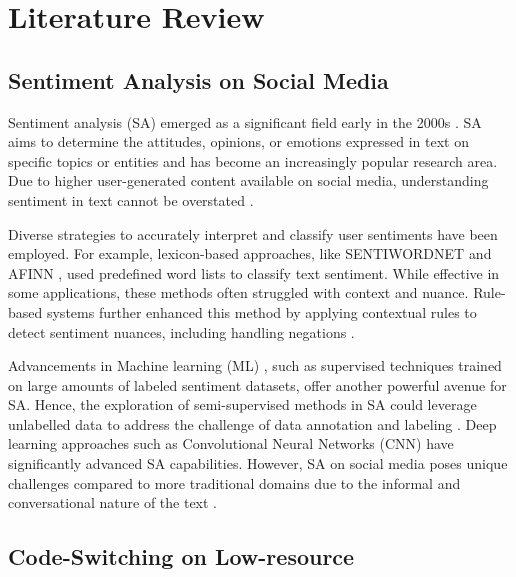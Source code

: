 \section{Literature Review}
\label{sxn:rw}
\subsection{Sentiment Analysis on Social Media}
Sentiment analysis (SA) emerged as a significant field early in the 2000s \cite{das2001yahoo, nasukawa2003sentiment}.  
SA \cite{dave2003mining, pang2008opinion} aims to determine the attitudes, opinions, or emotions expressed in text on specific topics or entities \cite{liu2022sentiment} and has become an increasingly popular research area. Due to higher user-generated content available on social media, understanding  sentiment in text cannot be overstated \cite{naseem2019dice}. 

Diverse strategies to accurately interpret and classify user sentiments have been employed. For example, lexicon-based approaches, like SENTIWORDNET \cite{baccianella2010sentiwordnet} and AFINN \cite{nielsen2011new}, used predefined word lists to classify text sentiment. While effective in some applications, these methods often struggled with context and nuance. Rule-based systems \cite{suttles2013distant} further enhanced this method by applying contextual rules to detect sentiment nuances, including handling negations \cite{taboada2011lexicon}.

Advancements in Machine learning (ML) \cite{pang2002thumbs}, such as supervised techniques trained on large amounts of labeled sentiment datasets, offer another powerful avenue for SA. 
Hence, the exploration of semi-supervised methods in SA could leverage unlabelled data to address the challenge of data annotation and labeling \cite{vo2015target, hwang2021semi}. Deep learning approaches such as Convolutional Neural Networks (CNN) \cite{chen2015convolutional} have significantly advanced SA capabilities. However, SA on social media poses unique challenges compared to more traditional domains due to the informal and conversational nature of the text \cite{medhat2014sentiment, naseem2019dice}. 

\subsection{Code-Switching on Low-resource}

